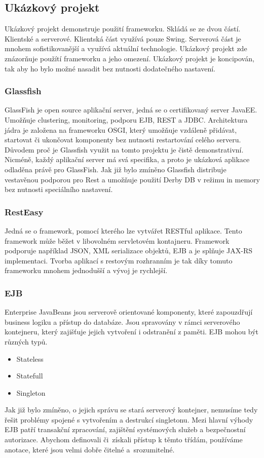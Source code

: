 \subsection{Ukázkový projekt}
Ukázkový projekt demonstruje použití frameworku. Skládá se ze dvou částí. Klientské a serverové. Klientská část využívá pouze Swing. Serverová část je mnohem sofistikovanější a využívá aktuální technologie. Ukázkový projekt zde znázorňuje použítí frameworku a jeho omezení. Ukázkový projekt je koncipován, tak aby ho bylo možné nasadit bez nutnosti dodatečného nastavení.
\subsubsection{Glassfish}
GlassFish \cite{glassfish} je open source aplikační server, jedná se o certifikovaný server JavaEE. Umožňuje clustering, monitoring, podporu EJB, REST a JDBC. Architektura jádra je založena na frameworku OSGI, který umožňuje vzdáleně přidávat, startovat či ukončovat komponenty bez nutnosti restartování celého serveru. Důvodem proč je Glassfish využit na tomto projektu je čistě demonstrativní. Nicméně, každý aplikační server má svá specifika, a proto je ukázková aplikace odladěna právě pro GlassFish. Jak již bylo zmíněno Glassfish distribuje vestavěnou podporou pro Rest a umožňuje použití Derby DB v režimu in memory bez nutnosti speciálního nastavení.
\subsubsection{RestEasy}
Jedná se o framework, pomocí kterého lze vytvářet RESTful aplikace. Tento framework může běžet v libovolném servletovém kontajneru. Framework podporuje například JSON, XML serializace objektů, EJB a je splňuje JAX-RS implementaci. Tvorba aplikací s restovým rozhranním je tak díky tomuto frameworku mnohem jednodušší a vývoj je rychlejší. 
\subsubsection{EJB}
Enterprise JavaBeans \cite{javaEETutorial} jsou serverově orientované komponenty, které zapouzdřují business logiku a přístup do databáze. Jsou spravovány v rámci serverového kontejneru, který zajišťuje jejich vytvoření i odstranění z paměti. EJB mohou být různých typů.
\begin{itemize}
\item Stateless
\item Statefull
\item Singleton
\end{itemize}
Jak již bylo zmíněno, o jejich správu se stará serverový kontejner, nemusíme tedy řešit problémy spojené s vytvořením a destrukcí singletonu\cite{gamma}. Mezi hlavní výhody EJB patří transakční zpracování, zajištění systémových služeb a bezpečnostní autorizace. Abychom definovali či~získali přístup k těmto třídám, používáme anotace, které jsou velmi dobře čitelné a~srozumitelné.

